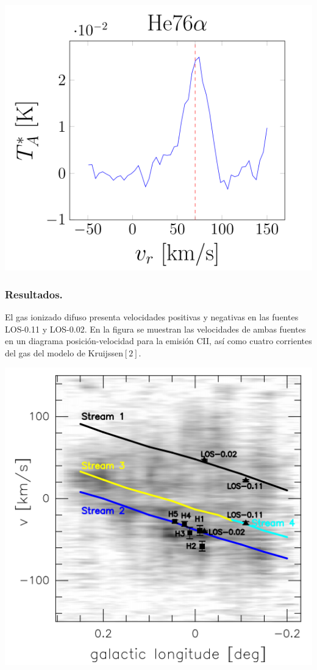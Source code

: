 \documentclass[8pt]{beamer}
\begin{document}
\begin{frame}
\begin{minipage}[t]{0.24\linewidth}
\end{minipage}
\begin{minipage}[t]{0.24\linewidth}
\includegraphics[width=0.95\linewidth]{figures/rrl2.png}
\end{minipage}
\end{frame}
\begin{frame}
\frametitle{Resultados.}
El gas ionizado difuso presenta velocidades positivas y negativas  en las fuentes LOS-0.11 y LOS-0.02. En la figura se muestran las velocidades de ambas fuentes en un diagrama posición-velocidad para la emisión CII, así como cuatro corrientes del gas del modelo de Kruijssen$[2]$. 
\begin{center}
\includegraphics[width=0.55\linewidth]{figures/rrl4.png}
\end{center}
\end{frame}
\end{document}
